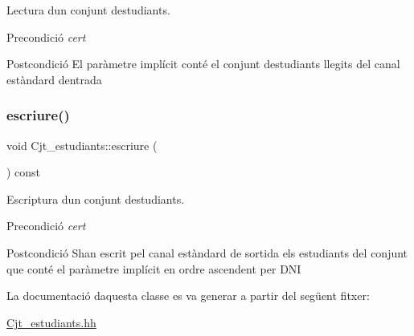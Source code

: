 Lectura d\textquotesingle{}un conjunt d\textquotesingle{}estudiants. 

\begin{DoxyPrecond}{Precondició}
{\itshape cert} 
\end{DoxyPrecond}
\begin{DoxyPostcond}{Postcondició}
El paràmetre implícit conté el conjunt d\textquotesingle{}estudiants llegits del canal estàndard d\textquotesingle{}entrada 
\end{DoxyPostcond}
\mbox{\label{class_cjt__estudiants_a2c25dbd33850025de3389617712f896a}} 
\subsubsection{\texorpdfstring{escriure()}{escriure()}}
{\footnotesize\ttfamily void Cjt\+\_\+estudiants\+::escriure (\begin{DoxyParamCaption}{ }\end{DoxyParamCaption}) const}



Escriptura d\textquotesingle{}un conjunt d\textquotesingle{}estudiants. 

\begin{DoxyPrecond}{Precondició}
{\itshape cert} 
\end{DoxyPrecond}
\begin{DoxyPostcond}{Postcondició}
S\textquotesingle{}han escrit pel canal estàndard de sortida els estudiants del conjunt que conté el paràmetre implícit en ordre ascendent per D\+NI 
\end{DoxyPostcond}


La documentació d\textquotesingle{}aquesta classe es va generar a partir del següent fitxer\+:\begin{DoxyCompactItemize}
\item 
\hyperlink{_cjt__estudiants_8hh}{Cjt\+\_\+estudiants.\+hh}\end{DoxyCompactItemize}
